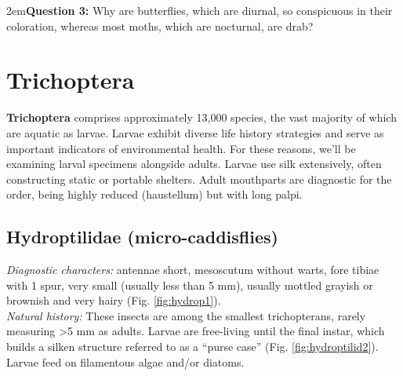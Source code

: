 \documentclass[letterpaper, 11pt]{article}
\begin{document}
\hangindent2em\textbf{Question 3:} Why are butterflies, which are diurnal, so conspicuous in their coloration, whereas most moths, which are nocturnal, are drab?\\

\FloatBarrier
\section{Trichoptera}

\noindent{}\textbf{Trichoptera} comprises approximately 13,000 species, 
the vast majority of which are aquatic as larvae. Larvae exhibit diverse life history strategies and serve as important indicators of environmental health. For these reasons, we'll be examining larval specimens alongside adults. Larvae use silk extensively, often constructing static or portable shelters. Adult mouthparts are diagnostic for the order, being highly reduced (haustellum) but with long palpi.

\subsection{Hydroptilidae (micro-caddisflies)}
\noindent{}\textit{Diagnostic characters:} antennae short, mesoscutum without warts, fore tibiae with 1 spur, very small (usually less than 5 mm), usually mottled grayish or brownish and very hairy (Fig. \ref{fig:hydrop1}).\\

\noindent{}\textit{Natural history:} These insects are among the smallest trichopterans, rarely measuring \textgreater5 mm as adults. Larvae are free-living until the final instar, which builds a silken structure referred to as a ``purse case'' (Fig. \ref{fig:hydroptilid2}). Larvae feed on filamentous algae and/or diatoms.
\end{document}
